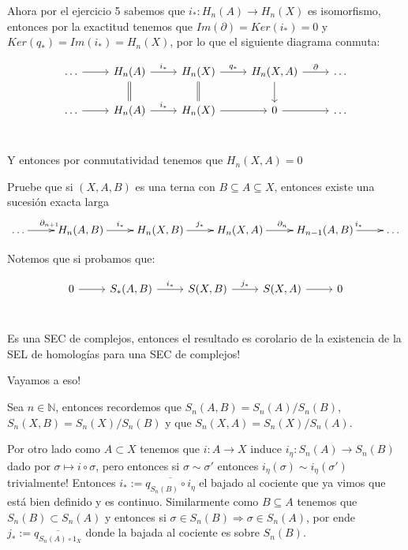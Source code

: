 \documentclass[11pt,a4paper,oneside]{article}
\newcommand{\N}{{\mathbb{N}}}
\newenvironment{proof}[1][Demostraci\'on]{\begin{trivlist}
\item[\hskip \labelsep {\bfseries #1}]}{\end{trivlist}}
\newcommand{\qed}{\nobreak \ifvmode \relax \else
      \ifdim\lastskip<1.5em \hskip-\lastskip
      \hskip1.5em plus0em minus0.5em \fi \nobreak
      \vrule height0.75em width0.5em depth0.25em\fi}
\begin{document}
\begin{enumerate}
\begin{proof}
Ahora por el ejercicio 5 sabemos que $i_*: H_n(A) \rightarrow H_n(X)$ es isomorfismo, entonces por la exactitud tenemos que $Im(\partial)=Ker(i_*)=0$ y $Ker(q_*) = Im(i_*)= H_n(X)$, por lo que el siguiente diagrama conmuta:

\[
\begin{tikzcd}
\dots \rar & {H_n}(A) \arrow{r}{i_*} \arrow[swap,equal,d] & {H_n}(X) \arrow{r}{q_*}  \arrow[swap,equal,d] & H_n(X,A) \arrow{r}{\partial}  \arrow[swap,d] & \dots  \\
\dots \rar & H_n(A) \arrow{r}{i_*} & {H_n}(X) \rar & 0 \rar & \dots  \\
\end{tikzcd}
\]

Y entonces por conmutatividad tenemos que $H_n(X,A) = 0$ \qed

\end{proof}

\item Pruebe que si $(X,A,B)$ es una terna con $B\subseteq A \subseteq X$, entonces existe una sucesi\'on exacta larga
\[\xymatrix{\dots\ar[r]^{\partial_{n+1}}&H_n(A,B)\ar[r]^{i_*}&H_n(X,B)\ar[r]^{j_*}&H_n(X,A) \ar[r]^{\partial_{n}}&H_{n-1}(A,B)\ar[r]^{i_*}&\dots}\]

\begin{proof}
Notemos que si probamos que:

\begin{equation}
\label{SEC}
\begin{tikzcd}
0 \rar & S_*(A,B) \arrow{r}{i_*} & S(X,B) \arrow{r}{j_*} & S(X,A) \rar & 0 \\
\end{tikzcd}
\end{equation}

Es una SEC de complejos, entonces el resultado es corolario de la existencia de la SEL de homolog\'ias para una SEC de complejos!

Vayamos a eso!

Sea $n \in \N$, entonces recordemos que $S_n(A,B) = S_n (A) / S_n(B)$, $S_n(X,B) = S_n(X) / S_n(B)$ y que $S_n(X,A) = S_n(X) / S_n(A)$. 

Por otro lado como $A \subset X$ tenemos que $i:A \rightarrow X$ induce $i_{\eta} : S_n(A) \rightarrow S_n(B)$ dado por $\sigma \mapsto i \circ \sigma$, pero entonces si $\sigma \sim \sigma'$ entonces $i_{\eta}(\sigma) \sim i_{\eta}(\sigma')$ trivialmente! Entonces $i_* := \overline{q_{S_n(B)} \circ i_{\eta}}$ el bajado al cociente que ya vimos que est\'a bien definido y es continuo. Similarmente como $B \subseteq A$ tenemos que $S_n(B) \subset S_n(A)$ y entonces si $\sigma \in S_n(B) \Longrightarrow \sigma \in S_n(A)$, por ende $j_* := \overline{q_{S_n(A) \circ 1_X}}$ donde la bajada al cociente es sobre $S_n(B)$.


\end{proof}
\end{enumerate}
\end{document}
